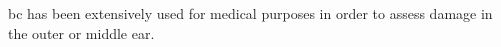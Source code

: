\gls{bc} has been extensively used for medical purposes in order to assess damage in the outer or middle ear.